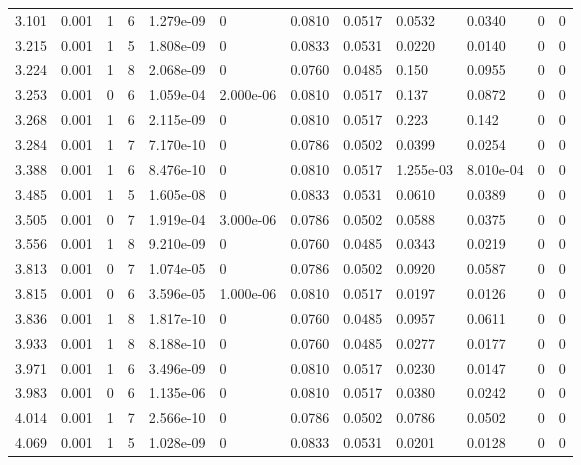 \documentclass[preview]{standalone}
\begin{document}
{{{\begin{tabular}{L{1.2cm}C{1.2cm} C{0.3cm}C{0.5cm} C{1.4cm}C{1.4cm} C{1.4cm}C{1.4cm} C{1.6cm}C{1.6cm} C{1.6cm}C{1.6cm}}
  3.101  &  0.001  & 1     &  6 &  1.279e-09  & 0  &  0.0810&   0.0517& 0.0532 & 0.0340   &  0 & 0  \\ 
  3.215  &  0.001  & 1     &  5 &  1.808e-09  & 0  &  0.0833&   0.0531& 0.0220 & 0.0140   &  0 & 0  \\ 
  3.224  &  0.001  & 1     &  8 &  2.068e-09  & 0  &  0.0760&   0.0485& 0.150 & 0.0955   &  0 & 0  \\ 
  3.253  &  0.001  & 0     &  6 &  1.059e-04  & 2.000e-06  &  0.0810&   0.0517& 0.137 & 0.0872   &  0 & 0  \\ 
  3.268  &  0.001  & 1     &  6 &  2.115e-09  & 0  &  0.0810&   0.0517& 0.223 & 0.142   &  0 & 0  \\ 
  3.284  &  0.001  & 1     &  7 &  7.170e-10  & 0  &  0.0786&   0.0502& 0.0399 & 0.0254   &  0 & 0  \\ 
  3.388  &  0.001  & 1     &  6 &  8.476e-10  & 0  &  0.0810&   0.0517& 1.255e-03 & 8.010e-04   &  0 & 0  \\ 
  3.485  &  0.001  & 1     &  5 &  1.605e-08  & 0  &  0.0833&   0.0531& 0.0610 & 0.0389   &  0 & 0  \\ 
  3.505  &  0.001  & 0     &  7 &  1.919e-04  & 3.000e-06  &  0.0786&   0.0502& 0.0588 & 0.0375   &  0 & 0  \\ 
  3.556  &  0.001  & 1     &  8 &  9.210e-09  & 0  &  0.0760&   0.0485& 0.0343 & 0.0219   &  0 & 0  \\ 
  3.813  &  0.001  & 0     &  7 &  1.074e-05  & 0  &  0.0786&   0.0502& 0.0920 & 0.0587   &  0 & 0  \\ 
  3.815  &  0.001  & 0     &  6 &  3.596e-05  & 1.000e-06  &  0.0810&   0.0517& 0.0197 & 0.0126   &  0 & 0  \\ 
  3.836  &  0.001  & 1     &  8 &  1.817e-10  & 0  &  0.0760&   0.0485& 0.0957 & 0.0611   &  0 & 0  \\ 
  3.933  &  0.001  & 1     &  8 &  8.188e-10  & 0  &  0.0760&   0.0485& 0.0277 & 0.0177   &  0 & 0  \\ 
  3.971  &  0.001  & 1     &  6 &  3.496e-09  & 0  &  0.0810&   0.0517& 0.0230 & 0.0147   &  0 & 0  \\ 
  3.983  &  0.001  & 0     &  6 &  1.135e-06  & 0  &  0.0810&   0.0517& 0.0380 & 0.0242   &  0 & 0  \\ 
  4.014  &  0.001  & 1     &  7 &  2.566e-10  & 0  &  0.0786&   0.0502& 0.0786 & 0.0502   &  0 & 0  \\ 
  4.069  &  0.001  & 1     &  5 &  1.028e-09  & 0  &  0.0833&   0.0531& 0.0201 & 0.0128   &  0 & 0  \\ 

\end{tabular}}}}
\end{document}
